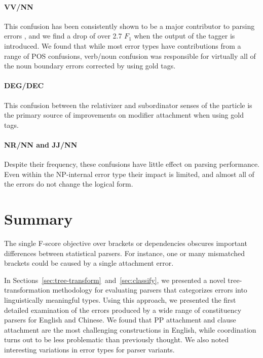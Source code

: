 \paragraph{VV/NN}  This confusion has been consistently shown to be a major
contributor to parsing errors
\parencite{Levy-Manning:2003:ACL,Tse-Curran:2012:NAACL-HLT,Qian-Liu:2012:EMNLP},
and we find a drop of over 2.7 $F_1$ when the output of the tagger is
introduced.  We found that while most error types have contributions from a
range of POS confusions, verb/noun confusion was responsible for virtually all of
the noun boundary errors corrected by using gold tags.

\paragraph{DEG/DEC}  This confusion between the relativizer and subordinator
senses of the particle  is the primary
source of improvements on modifier attachment when using gold tags.

\paragraph{NR/NN and JJ/NN}  Despite their frequency, these confusions have
little effect on parsing performance.  Even within the NP-internal error type
their impact is limited, and almost all of the errors do not change the
logical form.

\section{Summary}

The single F-score objective over brackets or dependencies obscures important differences between statistical parsers.
For instance, one or many mismatched brackets could be caused by a single attachment error.

In Sections~\ref{sec:tree-transform}~and~\ref{sec:classify}, we presented a novel tree-transformation methodology for
evaluating parsers that categorizes errors into linguistically meaningful
types.  Using this approach, we presented the first detailed examination of the
errors produced by a wide range of constituency parsers for
English and Chinese.  We found that PP attachment and clause attachment are the most
challenging constructions in English, while coordination turns out to be less problematic
than previously thought.  We also noted interesting variations in error types
for parser variants.

